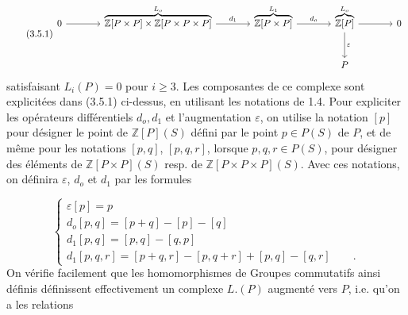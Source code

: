 \begin{equation}\tag{3.5.1}
\begin{tikzcd}[column sep=large, row sep=large]
0 \arrow[r] & \overbrace{\mathbb{Z}[P\times P]\times\mathbb{Z}[P\times P\times P]}^{L_o} \arrow[r, "d_1"] & \overbrace{\mathbb{Z}[P\times P]}^{L_1} \arrow[r, "d_o"] & \overbrace{\mathbb{Z}[P]}^{L_o} \arrow[r] \arrow[d, "\varepsilon"] & 0 \\
& & & P &
\end{tikzcd}
\end{equation}
 satisfaisant $L_i(P)=0$ pour $i \geq 3$. Les composantes de ce complexe sont explicitées dans (3.5.1) ci-dessus, en utilisant les notations de 1.4. Pour expliciter les opérateurs différentiels $d_o,d_1$ et l'augmentation $\varepsilon$, on utilise la notation $[p]$ pour désigner le point de $\mathbb{Z}[P](S)$ défini par le point $p \in P(S)$ de $P$, et de même pour les notations $[p,q]$, $[p,q,r]$, lorsque $p,q,r \in P(S)$, pour désigner des éléments de $\mathbb{Z}[P\times P](S)$ resp. de $\mathbb{Z}[P\times P\times P](S)$. Avec ces notations, on définira $\varepsilon$, $d_o$ et $d_1$ par les formules

\begin{equation}\tag{3.5.2}
\left\{
\begin{array}{l}
\varepsilon[p] = p \\[1.5ex]
d_o[p,q]= [p+q] - [p] - [q] \\[1.5ex]
d_1[p,q]= [p,q] - [q,p] \\[1.5ex]
d_1[p,q,r] = [p+q,r] - [p,q+r] + [p,q] - [q,r] \qquad .
\end{array}
\right.
\end{equation}
On vérifie facilement que les homomorphismes de Groupes commutatifs ainsi définis définissent effectivement un complexe $L.(P)$ augmenté vers $P$, i.e. qu'on a les relations

